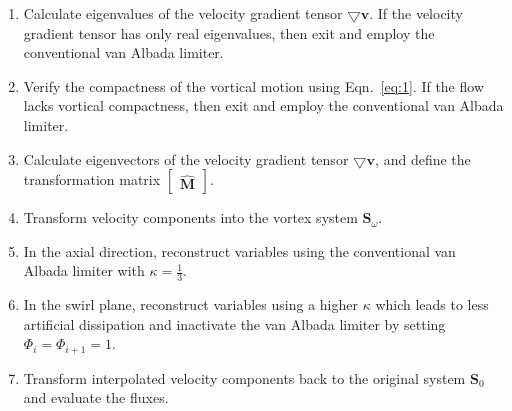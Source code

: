 \begin{enumerate}[nolistsep]

\item Calculate eigenvalues of the velocity gradient tensor $\pmb\bigtriangledown\mathbf{v}$. If the velocity gradient tensor has only real eigenvalues, then exit and employ the conventional van Albada limiter.

\item Verify the compactness of the vortical motion using Eqn.~\ref{eq:1}. If the flow lacks vortical compactness, then exit and employ the conventional van Albada limiter.

\item Calculate eigenvectors of the velocity gradient tensor $\pmb\bigtriangledown\mathbf{v}$, and define the transformation matrix $\begin{bmatrix}
\hat{\mathbf{M}}
\end{bmatrix}$. 

\item Transform velocity components into the vortex system $\mathbf{S}_{\omega}$.

\item In the axial direction, reconstruct variables using the conventional van Albada limiter with $\kappa=\frac{1}{3}$.

\item In the swirl plane, reconstruct variables using a higher $\kappa$ which leads to less artificial dissipation and inactivate the van Albada limiter by setting $\Phi_{i} = \Phi_{i+1} = 1$. 

\item Transform interpolated velocity components back to the original system $\mathbf{S}_{0}$ and evaluate the fluxes.
\end{enumerate}



